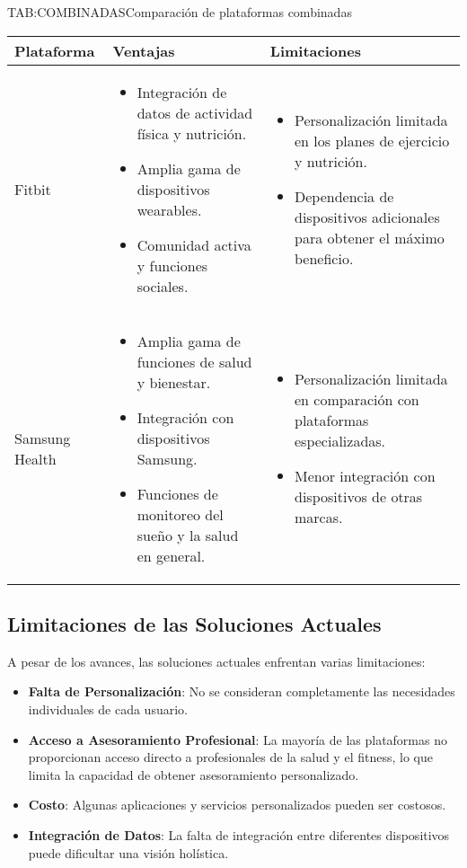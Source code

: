 \begin{table}[Comparación de plataformas combinadas]{TAB:COMBINADAS}{Comparación de plataformas combinadas}
  \begin{tabular}{|p{3cm}|p{5cm}|p{5cm}|}
    \hline
    \textbf{Plataforma} & \textbf{Ventajas} & \textbf{Limitaciones} \\
    \hline
    Fitbit & \begin{itemize}
      \item Integración de datos de actividad física y nutrición.
      \item Amplia gama de dispositivos wearables.
      \item Comunidad activa y funciones sociales.
    \end{itemize} & \begin{itemize}
      \item Personalización limitada en los planes de ejercicio y nutrición.
      \item Dependencia de dispositivos adicionales para obtener el máximo beneficio.
    \end{itemize} \\
    \hline
    Samsung Health & \begin{itemize}
      \item Amplia gama de funciones de salud y bienestar.
      \item Integración con dispositivos Samsung.
      \item Funciones de monitoreo del sueño y la salud en general.
    \end{itemize} & \begin{itemize}
      \item Personalización limitada en comparación con plataformas especializadas.
      \item Menor integración con dispositivos de otras marcas.
    \end{itemize} \\
    \hline
  \end{tabular}
\end{table}

\subsection{Limitaciones de las Soluciones Actuales}

A pesar de los avances, las soluciones actuales enfrentan varias limitaciones:

\begin{itemize}
  \item \textbf{Falta de Personalización}: No se consideran completamente las necesidades individuales de cada usuario.
  \item \textbf{Acceso a Asesoramiento Profesional}: La mayoría de las plataformas no proporcionan acceso directo a profesionales de la salud y el fitness, lo que limita la capacidad de obtener asesoramiento personalizado.
  \item \textbf{Costo}: Algunas aplicaciones y servicios personalizados pueden ser costosos.
  \item \textbf{Integración de Datos}: La falta de integración entre diferentes dispositivos puede dificultar una visión holística.
\end{itemize}
